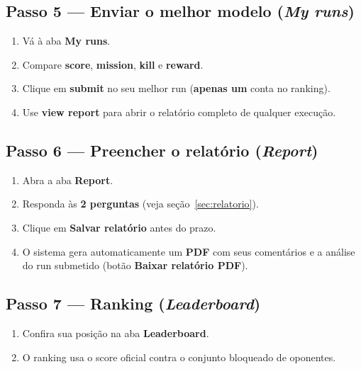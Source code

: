 \documentclass[11pt,a4paper]{article}
\begin{document}
\subsection*{Passo 5 — Enviar o melhor modelo (\emph{My runs})}
\begin{enumerate}[label=\textbf{\arabic*.},start=11]
  \item Vá à aba \textbf{My runs}.
  \item Compare \textbf{score}, \textbf{mission}, \textbf{kill} e \textbf{reward}.
  \item Clique em \textbf{submit} no seu melhor run (\textbf{apenas um} conta no ranking).
  \item Use \textbf{view report} para abrir o relatório completo de qualquer execução.
\end{enumerate}

\subsection*{Passo 6 — Preencher o relatório (\emph{Report})}
\begin{enumerate}[label=\textbf{\arabic*.},start=15]
  \item Abra a aba \textbf{Report}.
  \item Responda às \textbf{2 perguntas} (veja seção~\ref{sec:relatorio}).
  \item Clique em \textbf{Salvar relatório} antes do prazo.
  \item O sistema gera automaticamente um \textbf{PDF} com seus comentários e a análise do run submetido (botão \textbf{Baixar relatório PDF}).
\end{enumerate}

\subsection*{Passo 7 — Ranking (\emph{Leaderboard})}
\begin{enumerate}[label=\textbf{\arabic*.},start=18]
  \item Confira sua posição na aba \textbf{Leaderboard}.
  \item O ranking usa o score oficial contra o conjunto bloqueado de oponentes.
\end{enumerate}
\end{document}

